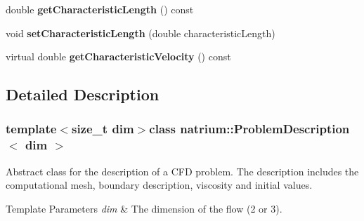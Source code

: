 \begin{DoxyCompactItemize}
\item 
\hypertarget{classnatrium_1_1ProblemDescription_ac424dbc36ad2d61d128f3656a8d6952d}{double {\bfseries get\-Characteristic\-Length} () const }\label{classnatrium_1_1ProblemDescription_ac424dbc36ad2d61d128f3656a8d6952d}

\item 
\hypertarget{classnatrium_1_1ProblemDescription_adc48f96c34c6318d911bbc41582c202b}{void {\bfseries set\-Characteristic\-Length} (double characteristic\-Length)}\label{classnatrium_1_1ProblemDescription_adc48f96c34c6318d911bbc41582c202b}

\item 
\hypertarget{classnatrium_1_1ProblemDescription_a3af2ccea3bfbb7d1aa39570579fcf937}{virtual double {\bfseries get\-Characteristic\-Velocity} () const }\label{classnatrium_1_1ProblemDescription_a3af2ccea3bfbb7d1aa39570579fcf937}

\end{DoxyCompactItemize}


\subsection{Detailed Description}
\subsubsection*{template$<$size\-\_\-t dim$>$class natrium\-::\-Problem\-Description$<$ dim $>$}

Abstract class for the description of a C\-F\-D problem. The description includes the computational mesh, boundary description, viscosity and initial values. 


\begin{DoxyTemplParams}{Template Parameters}
{\em dim} & The dimension of the flow (2 or 3). \\
\hline
\end{DoxyTemplParams}


